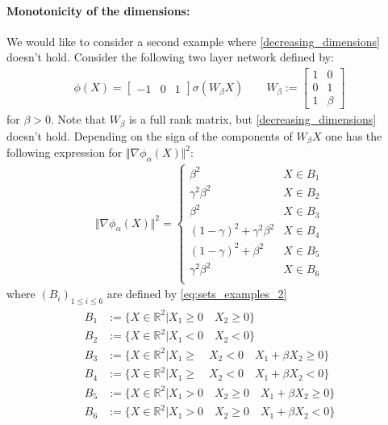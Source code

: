 \documentclass{article}
\newcommand{\R}{\mathbb R}
\begin{document}
\paragraph{Monotonicity of the dimensions:}\label{example_monotonicity_dimensions} We would like to consider a second example where \cref{decreasing_dimensions} doesn't hold. Consider the following two layer network defined by:
\begin{align}
  \phi(X) = \begin{bmatrix}-1 & 0 & 1\end{bmatrix} \sigma(W_{\beta}X)
  \qquad
  W_{\beta} := \begin{bmatrix}
    1 & 0\\
    0 & 1\\
    1 & \beta
  \end{bmatrix}
\end{align}
for $\beta >0$. Note that $W_{\beta}$ is a full rank matrix, but \cref{decreasing_dimensions} doesn't hold. Depending on the sign of the components of $W_{\beta}X$ one has the following expression for $\Vert \nabla \phi_{\alpha}(X)\Vert^2 $:
\begin{align}
  \Vert \nabla \phi_{\alpha}(X)\Vert^2 = \begin{cases}
    \beta^2 & X\in B_1\\
    \gamma^2 \beta^2 & X\in B_2\\
    \beta^2 & X\in B_3\\
    (1-\gamma)^2 + \gamma^2\beta^2 & X\in B_4\\
    (1-\gamma)^2 + \beta^2 & X\in B_5\\
    \gamma^2 \beta^2 & X\in B_6\\
  \end{cases}
\end{align}
where $(B_i)_{1\leq i\leq 6}$ are defined by \cref{eq:sets_examples_2}
\begin{align}\label{eq:sets_examples_2}
\begin{split}
B_1 &:= \{X\in\R^2 | X_1 \geq 0 \quad X_2 \geq 0 \}\\
B_2 &:= \{X\in\R^2 | X_1 < 0 \quad X_2 < 0 \}\\
B_3 &:= \{X\in\R^2 | X_1 \geq \quad X_2 < 0 \quad X_1 +\beta X_2 \geq 0  \}\\
B_4 &:= \{X\in\R^2 | X_1 \geq \quad X_2 < 0 \quad X_1 +\beta X_2 < 0 \}\\
B_5 &:= \{X\in\R^2 | X_1 > 0 \quad X_2 \geq 0 \quad X_1 +\beta X_2 \geq 0  \}\\
B_6 &:= \{X\in\R^2 | X_1 > 0 \quad X_2 \geq 0 \quad X_1 +\beta X_2 < 0  \}
\end{split}
\end{align}
\end{document}
